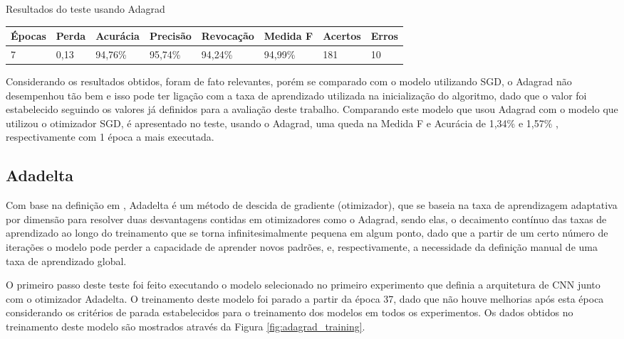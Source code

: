 \documentclass[
	12pt,				%
	oneside,			%
	a4paper,			%
	english,			%
	brazil				%
	]{abntex2ppgsi}
\begin{document}
\begin{quadro}[H]
\caption{Resultados do teste usando Adagrad}
\label{quad:test_adagrad}
\centering
\begin{tabular}{|l|l|l|l|l|l|l|l|}
\cline{1-8}
Épocas & Perda & Acurácia & Precisão & Revocação & Medida F & Acertos & Erros \\ \hline
7 & 0,13 & 94,76\% & 95,74\% & 94,24\% & 94,99\% & 181 & 10 \\
\cline{1-8}
\end{tabular}
\end{quadro}

Considerando os resultados obtidos, foram de fato relevantes, porém se comparado com o modelo utilizando SGD, o Adagrad não desempenhou tão bem e isso pode ter ligação com a taxa de aprendizado utilizada na inicialização do algoritmo, dado que o valor foi estabelecido seguindo os valores já definidos para a avaliação deste trabalho. Comparando este modelo que usou Adagrad com o modelo que utilizou o otimizador SGD, é apresentado no teste, usando o Adagrad, uma queda na Medida F e Acurácia de 1,34\% e 1,57\% , respectivamente com 1 época a mais executada.

\subsection{Adadelta}
Com base na definição em , Adadelta é um método de descida de gradiente (otimizador), que se baseia na taxa de aprendizagem adaptativa por dimensão para resolver duas desvantagens contidas em otimizadores como o Adagrad, sendo elas, o decaimento contínuo das taxas de aprendizado ao longo do treinamento que se torna infinitesimalmente pequena em algum ponto, dado que a partir de um certo número de iterações o modelo pode perder a capacidade de aprender novos padrões, e, respectivamente, a necessidade da definição manual de uma taxa de aprendizado global.

O primeiro passo deste teste foi feito executando o modelo selecionado no primeiro experimento que definia a arquitetura de CNN junto com o otimizador Adadelta. O treinamento deste modelo foi parado a partir da época 37, dado que não houve melhorias após esta época considerando os critérios de parada estabelecidos para o treinamento dos modelos em todos os experimentos. Os dados obtidos no treinamento deste modelo são mostrados através da Figura \ref{fig:adagrad_training}.
\end{document}
